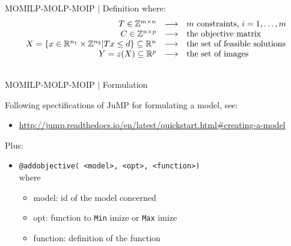 \documentclass[10pt,xcolor=dvipsnames]{beamer}
\newcommand{\mR}{\mathbb{R}}
\newcommand{\mZ}{\mathbb{Z}}
\newcommand{\red}{\textcolor{red}}
\newcommand{\blue}{\textcolor{blue}}
\begin{document}
\begin{frame}{MOMILP-MOLP-MOIP $\mid$ Definition}
\bigskip
\noindent 
where:
$$
\begin{array}{rcl}
T \in \mZ^{m \times n} & \longrightarrow & m \hbox{ constraints, } i = 1,\ldots,m\\
%
C \in \mZ^{n\times p} & \longrightarrow & \hbox{the objective matrix}\\
%
X=\{x \in \mR^{n_1} \times \mZ^{n_2}| Tx\leq d\}\subseteq\mR^n  & \longrightarrow & \hbox{the set of feasible solutions}\\
Y=z(X)\subseteq \mR^p & \longrightarrow & \hbox{the set of images}\\
\notag
\end{array}
$$

\end{frame}

%
% 
\begin{frame}{MOMILP-MOLP-MOIP $\mid$ Formulation}

Following spectifications of JuMP for formulating a model, see:
\begin{itemize}
  \item \url{http://jump.readthedocs.io/en/latest/quickstart.html\#creating-a-model}
\end{itemize}

\bigskip

Plus:

\begin{itemize}
  \item \texttt{@addobjective( <model>, <opt>, <function>)}\bigskip\\

  where 
  \begin{itemize}
  \item model: id of the model concerned
  \item opt: function to \texttt{Min} imize or \texttt{Max} imize
  \item function: definition of the function
  \end{itemize}
\end{itemize}  

\end{frame}
\end{document}
